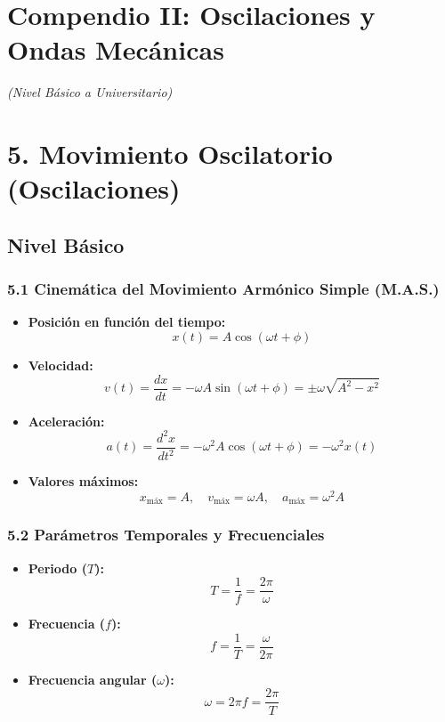 \documentclass[11pt,a4paper]{article}
\begin{document}
\section*{Compendio II: Oscilaciones y Ondas Mecánicas}

\textit{(Nivel Básico a Universitario)}

\section*{5. Movimiento Oscilatorio (Oscilaciones)}

\subsection*{Nivel Básico}

\subsubsection*{5.1 Cinemática del Movimiento Armónico Simple (M.A.S.)}

\begin{itemize}
  \item \textbf{Posición en función del tiempo:}
  \[
    x(t) = A \cos(\omega t + \phi)
  \]
  \item \textbf{Velocidad:}
  \[
    v(t) = \frac{dx}{dt} = -\omega A \sin(\omega t + \phi) = \pm \omega \sqrt{A^2 - x^2}
  \]
  \item \textbf{Aceleración:}
  \[
    a(t) = \frac{d^2x}{dt^2} = -\omega^2 A \cos(\omega t + \phi) = -\omega^2 x(t)
  \]
  \item \textbf{Valores máximos:}
  \[
    x_{\text{máx}} = A, \quad v_{\text{máx}} = \omega A, \quad a_{\text{máx}} = \omega^2 A
  \]
\end{itemize}

\subsubsection*{5.2 Parámetros Temporales y Frecuenciales}

\begin{itemize}
  \item \textbf{Periodo ($T$):}
  \[
    T = \frac{1}{f} = \frac{2\pi}{\omega}
  \]
  \item \textbf{Frecuencia ($f$):}
  \[
    f = \frac{1}{T} = \frac{\omega}{2\pi}
  \]
  \item \textbf{Frecuencia angular ($\omega$):}
  \[
    \omega = 2\pi f = \frac{2\pi}{T}
  \]
\end{itemize}
\end{document}

